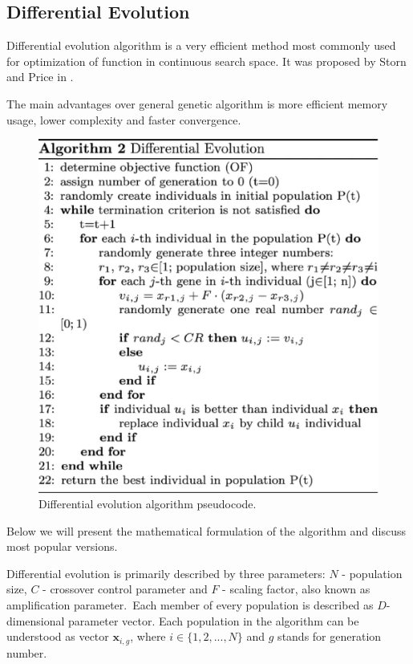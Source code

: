 \documentclass[12pt,a4paper,openany]{book}
\begin{document}
\subsection{Differential Evolution}

\noindent Differential evolution algorithm is a very efficient method most commonly used for optimization of function in continuous search space. It was proposed by Storn and Price in \cite{de}.

\noindent The main advantages over general genetic algorithm is more efficient memory usage, lower complexity and faster convergence.

 \begin{figure}[H]
     \centering
     \includegraphics[scale=0.5]{figs/diff-evo.eps}
     \caption{Differential evolution algorithm pseudocode. \cite{de}}\label{Fig:PROGAN}
 \end{figure}

\noindent Below we will present the mathematical formulation of the algorithm and discuss most popular versions.

\noindent Differential evolution is primarily described by three parameters: $N$ - population size, $C$ - crossover control parameter and $F$ - scaling factor, also known as amplification parameter.\
Each member of every population is described as $D$-dimensional parameter vector. Each population in the algorithm can be understood as vector $\textbf{x}_{i, g}$, where $i \in \{1, 2, ..., N\}$ and $g$ stands for generation number.
\end{document}
